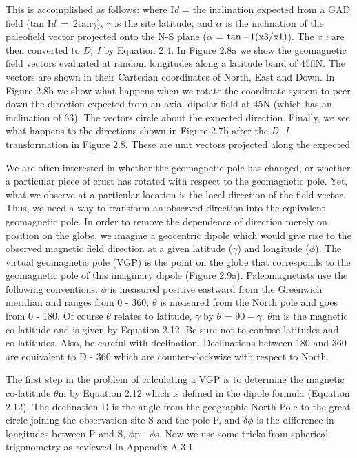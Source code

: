 \documentclass[draft,plain]{tauxe}
\begin{document}
This is accomplished as follows: where I{\it d} = the inclination expected from a GAD field (tan
\hbox{I{\it d} = 2tan$\gamma$}), $\gamma$ is the site latitude, and $\alpha$ is the inclination of the paleofield vector projected onto the N-S plane ($\alpha$ = $\tan-1({\rm x}3/{\rm x}1)$).
The {\it x i} are then converted to {\it D, I} by Equation 2.4. In Figure 2.8a we
show the geomagnetic field vectors evaluated at random longitudes along a latitude band of 45f{l}N.
The vectors are shown in their Cartesian coordinates of North, East and Down. In Figure 2.8b we
show what happens when we rotate the coordinate system to peer down the direction expected from
an axial dipolar field at 45N (which has an inclination of 63). The vectors circle about the expected
direction. Finally, we see what happens to the directions shown in Figure 2.7b after the {\it D, I}
transformation in Figure 2.8. These are unit vectors projected along the expected

We are often interested in whether the geomagnetic pole has changed, or whether a
particular piece of crust has rotated with respect to the geomagnetic pole. Yet, what we observe
at a particular location is the local direction of the field vector. Thus, we need a way to transform
an observed direction into the equivalent geomagnetic pole. In order to remove the dependence of
direction merely on position on the globe, we imagine a geocentric dipole which would give rise to
the observed magnetic field direction at a given latitude ($\gamma$) and longitude ($\phi$). The virtual geomagnetic
pole (VGP) is the point on the globe that corresponds to the geomagnetic pole of this imaginary
dipole (Figure 2.9a). Paleomagnetists use the following conventions: $\phi$ is measured positive
eastward from the Greenwich meridian and ranges from 0 - 360; $\theta$ is measured from the North
pole and goes from 0 - 180. Of course $\theta$ relates to latitude, $\gamma$ by $\theta$ = $90-\gamma$. $\theta$m is the magnetic
co-latitude and is given by Equation 2.12. Be sure not to confuse latitudes and co-latitudes. Also, be
careful with declination. Declinations between 180 and
360 are equivalent to D - 360 which are counter-clockwise with respect to North.

The first step in the problem of calculating a VGP is to determine the magnetic co-latitude $\theta$m
by Equation 2.12 which is defined in the dipole formula (Equation 2.12). The declination D is the
angle from the geographic North Pole to the great circle joining the observation site S and the pole
P, and $\delta\phi$ is the difference in longitudes between P and S, $\phi$p - $\phi$s. Now we use some tricks from
spherical trigonometry as reviewed in Appendix A.3.1
\end{document}
